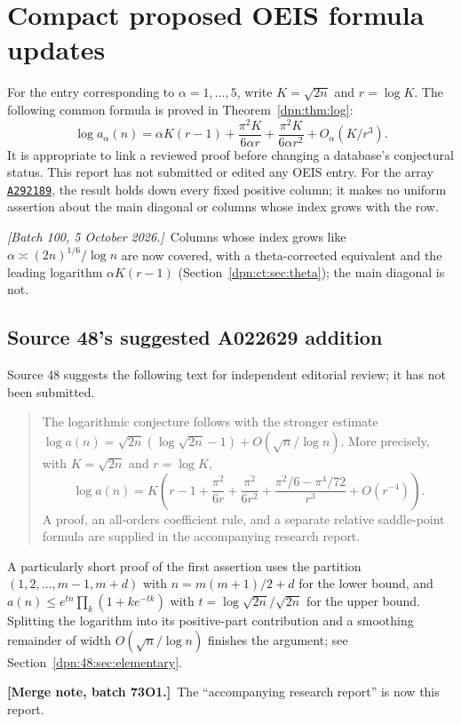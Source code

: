 \documentclass[11pt]{article}
\numberwithin{equation}{section}
\theoremstyle{definition}\newtheorem{definition}[theorem]{Definition}
\theoremstyle{remark}\newtheorem{remark}[theorem]{Remark}
\newcommand{\OEIS}[1]{\href{https://oeis.org/#1}{\texttt{#1}}}
\newcommand{\mergenote}[1]{\par\smallskip\noindent\textbf{[Merge note, batch 73O1.]}\ #1\par\smallskip}
\newcommand{\writenoted}[1]{\par\smallskip\noindent\textit{[Batch 100, 5 October 2026.]}\ #1\par\smallskip}
\begin{document}
\section{Compact proposed OEIS formula updates}
For the entry corresponding to $\alpha=1,\ldots,5$, write
$K=\sqrt{2n}$ and $r=\log K$. The following common formula is proved in
Theorem~\ref{dpn:thm:log}:
\[
 \log a_\alpha(n)=\alpha K(r-1)
       +\frac{\pi^2K}{6\alpha r}
       +\frac{\pi^2K}{6\alpha r^2}
       +O_\alpha(K/r^3).
\]
It is appropriate to link a reviewed proof before changing a database's
conjectural status. This report has not submitted or edited any OEIS entry.
For the array \OEIS{A292189}, the result holds down every fixed positive
column; it makes no uniform assertion about the main diagonal or columns
whose index grows with the row.
\writenoted{Columns whose index grows like $\alpha\asymp(2n)^{1/6}/\log n$
are now covered, with a theta-corrected equivalent and the leading logarithm
$\alpha K(r-1)$ (Section~\ref{dpn:ct:sec:theta}); the main diagonal is not.}

\subsection*{Source 48's suggested A022629 addition}
Source 48 suggests the following text for independent editorial review; it
has not been submitted.
\begin{quote}
The logarithmic conjecture follows with the stronger estimate
$\log a(n)=\sqrt{2n}(\log\sqrt{2n}-1)+O(\sqrt n/\log n)$.
More precisely, with $K=\sqrt{2n}$ and $r=\log K$,
\[
 \log a(n)=K\left(r-1+\frac{\pi^2}{6r}
  +\frac{\pi^2}{6r^2}
  +\frac{\pi^2/6-\pi^4/72}{r^3}
  +O(r^{-4})\right).
\]
A proof, an all-orders coefficient rule, and a separate relative saddle-point
formula are supplied in the accompanying research report.
\end{quote}
A particularly short proof of the first assertion uses the partition
$(1,2,\ldots,m-1,m+d)$ with $n=m(m+1)/2+d$ for the lower bound, and
$a(n)\le e^{tn}\prod_k(1+ke^{-tk})$ with $t=\log\sqrt{2n}/\sqrt{2n}$ for the
upper bound.  Splitting the logarithm into its positive-part contribution and
a smoothing remainder of width $O(\sqrt n/\log n)$ finishes the argument; see
Section~\ref{dpn:48:sec:elementary}.
\mergenote{The ``accompanying research report'' is now this report.}
\end{document}
